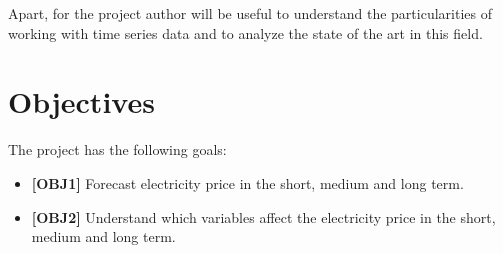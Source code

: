 Apart, for the project author will be useful to understand the particularities of working with time series data and to analyze the state of the art in this field.

\section{Objectives}
The project has the following goals:
\begin{itemize}
    \item \textbf{[OBJ1]} Forecast electricity price in the short, medium and long term.
    \item \textbf{[OBJ2]} Understand which variables affect the electricity price in the short, medium and long term.
\end{itemize}